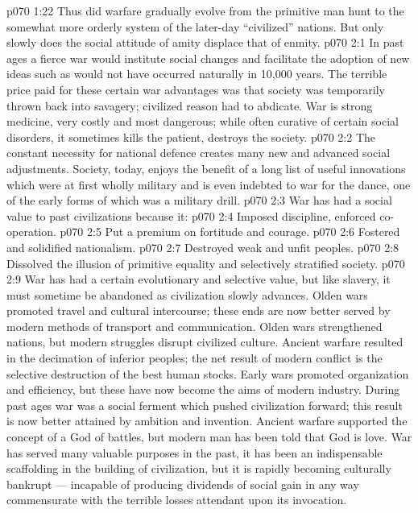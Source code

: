 \vs p070 1:22 Thus did warfare gradually evolve from the primitive man hunt to the somewhat more orderly system of the later\hyp{}day “civilized” nations. But only slowly does the social attitude of amity displace that of enmity.
\vs p070 2:1 In past ages a fierce war would institute social changes and facilitate the adoption of new ideas such as would not have occurred naturally in 10,000 years. The terrible price paid for these certain war advantages was that society was temporarily thrown back into savagery; civilized reason had to abdicate. War is strong medicine, very costly and most dangerous; while often curative of certain social disorders, it sometimes kills the patient, destroys the society.
\vs p070 2:2 The constant necessity for national defence creates many new and advanced social adjustments. Society, today, enjoys the benefit of a long list of useful innovations which were at first wholly military and is even indebted to war for the dance, one of the early forms of which was a military drill.
\vs p070 2:3 \pc War has had a social value to past civilizations because it:
\vs p070 2:4 \bibnobreakspace Imposed discipline, enforced co\hyp{}operation.
\vs p070 2:5 \bibnobreakspace Put a premium on fortitude and courage.
\vs p070 2:6 \bibnobreakspace Fostered and solidified nationalism.
\vs p070 2:7 \bibnobreakspace Destroyed weak and unfit peoples.
\vs p070 2:8 \bibnobreakspace Dissolved the illusion of primitive equality and selectively stratified society.
\vs p070 2:9 \pc War has had a certain evolutionary and selective value, but like slavery, it must sometime be abandoned as civilization slowly advances. Olden wars promoted travel and cultural intercourse; these ends are now better served by modern methods of transport and communication. Olden wars strengthened nations, but modern struggles disrupt civilized culture. Ancient warfare resulted in the decimation of inferior peoples; the net result of modern conflict is the selective destruction of the best human stocks. Early wars promoted organization and efficiency, but these have now become the aims of modern industry. During past ages war was a social ferment which pushed civilization forward; this result is now better attained by ambition and invention. Ancient warfare supported the concept of a God of battles, but modern man has been told that God is love. War has served many valuable purposes in the past, it has been an indispensable scaffolding in the building of civilization, but it is rapidly becoming culturally bankrupt --- incapable of producing dividends of social gain in any way commensurate with the terrible losses attendant upon its invocation.
